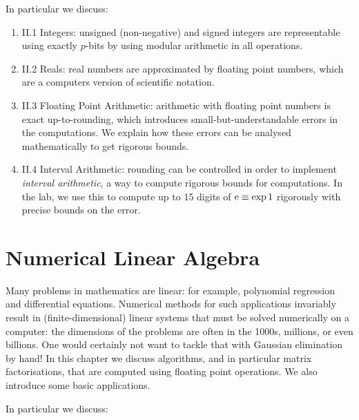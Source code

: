 \documentclass[12pt,a4paper]{book}
\theoremstyle{definition}
\begin{document}
In particular we discuss:

\begin{enumerate}
\item II.1 Integers: unsigned (non-negative) and signed integers are representable using exactly $p$-bits by using modular arithmetic in all operations.
\item II.2 Reals:  real numbers are approximated by floating point numbers, which are a computers version of scientific notation.
\item II.3 Floating Point Arithmetic:  arithmetic with floating point numbers is exact up-to-rounding, which introduces small-but-understandable errors in the computations. We explain how these errors can be analysed mathematically to get rigorous bounds. 
\item II.4 Interval Arithmetic: rounding can be controlled in order to implement {\it interval arithmetic}, a way to compute rigorous bounds for computations. In the lab, we use this to compute up to 15 digits of ${\rm e} \equiv \exp 1$ rigorously with precise bounds on the error.
\end{enumerate}








\chapter{Numerical Linear Algebra}

Many problems in mathematics are linear: for example, polynomial regression and
differential equations. Numerical methods for such applications invariably result
in (finite-dimensional) linear systems that must be solved numerically on a computer: 
the dimensions of the problems are often in the 1000s, millions, or even billions.
One would certainly not want to tackle that with Gaussian elimination by hand!
In this chapter we discuss algorithms, and in particular matrix factorisations, that are
computed using floating point operations. We also introduce some basic applications.



In particular we discuss:
\end{document}
